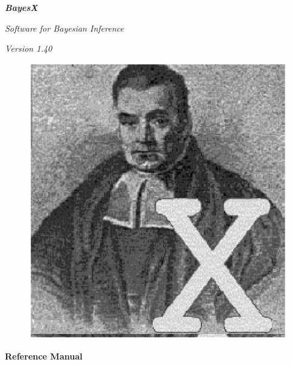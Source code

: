 
\thispagestyle{empty}

\begin{center}
{\bf \em \huge Bayes{\Huge X}}

\vspace{0.5cm}

{\em \large Software for Bayesian Inference}

\vspace{0.5cm}

{\em Version 1.40}

\vspace{0.5cm}

\begin{figure}[h]
\begin{center}
\includegraphics[scale=1.2]{grafiken/bayesicon.eps}
\end{center}
\end{figure}

\vfill

{\bf\sffamily \huge Reference Manual}

\vfill

\end{center}

